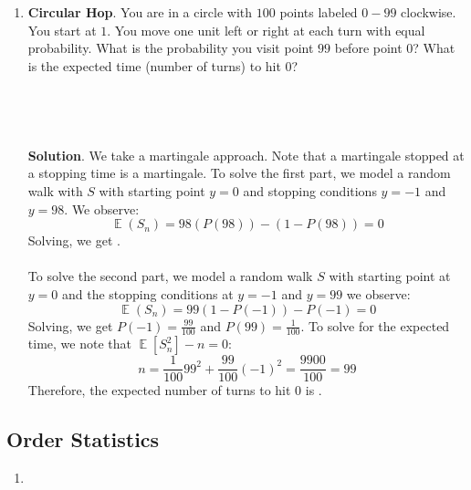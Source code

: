 \documentclass{article}
\DeclareMathOperator{\EX}{\mathbb{E}}%
\begin{document}
\begin{enumerate}
        
    \item \textbf{Circular Hop}. You are in a circle with $100$ points labeled $0 - 99$ clockwise. You start at $1$. You move one unit left or right at each turn with equal probability. What is the probability you visit point $99$ before point $0$? What is the expected time (number of turns) to hit $0$?
    \\
    \\
    \\
    \\
    \\
    \textbf{Solution}. We take a martingale approach. Note that a martingale stopped at a stopping time is a martingale. To solve the first part, we model a random walk with $S$ with starting point $y = 0$ and stopping conditions $y = -1$ and $y = 98$. We observe:
    \begin{equation}
        \EX(S_n) = 98 (P(98)) - (1 - P(98)) = 0
    \end{equation}
    Solving, we get .
    \\
    \\
    To solve the second part, we model a random walk $S$ with starting point at $y = 0$ and the stopping conditions at $y = -1$ and $y = 99$ we observe:
    \begin{equation}
        \EX(S_n) = 99 (1 - P(-1)) - P(-1) = 0
    \end{equation}
    Solving, we get \(P(-1) = \frac{99}{100}\) and \(P(99) = \frac{1}{100}\). To solve for the expected time, we note that $\EX[S_n^2] - n = 0$:
    \begin{equation}
        n = \frac{1}{100}99^2 + \frac{99}{100}(-1)^2 = \frac{9900}{100} = 99
    \end{equation}
    Therefore, the expected number of turns to hit $0$ is .
\end{enumerate}

\subsection{Order Statistics}
\begin{enumerate}
    \item 
\end{enumerate}
\end{document}
